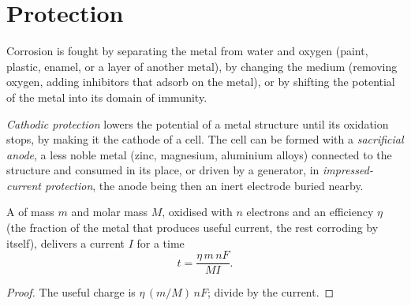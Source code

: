 \section{Protection}

Corrosion is fought by separating the metal from water and oxygen (paint,
plastic, enamel, or a layer of another metal), by changing the medium
(removing oxygen, adding inhibitors that adsorb on the metal), or by shifting the
potential of the metal into its domain of immunity.

\begin{definition}\label{def:b2:corrosion:protection}
\emph{Cathodic protection} lowers the potential of a
metal structure until its oxidation stops, by making it the cathode of a cell.
The cell can be formed with a \emph{sacrificial anode},
a less noble metal (zinc, magnesium, aluminium alloys) connected to the
structure and consumed in its place, or driven by a generator, in
\emph{impressed-current protection}, the
anode being then an inert electrode buried nearby.
\end{definition}

\begin{proposition}\label{prop:b2:corrosion:anode-life}
A  of mass $m$ and molar mass $M$, oxidised with $n$ electrons
and an efficiency $\eta$ (the fraction of the metal that produces useful
current, the rest corroding by itself), delivers a current $I$ for a time
\[
  t = \frac{\eta\,m\,nF}{M I} .
\]
\end{proposition}

\begin{proof}
The useful charge is $\eta\,(m/M)\,nF$; divide by the current.
\end{proof}

